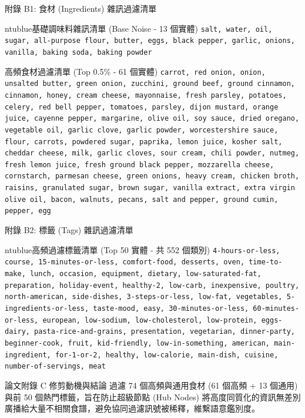 \documentclass[aspectratio=169, 10pt]{beamer}
\begin{document}
\begin{frame}{附錄 B1: 食材 (Ingredients) 雜訊過濾清單}
  \begin{mybox}{ntublue}{基礎調味料雜訊清單 (Base Noise - 13 個實體)}
    \small \texttt{salt, water, oil, sugar, all-purpose flour, butter, eggs, black pepper, garlic, onions, vanilla, baking soda, baking powder}
  \end{mybox}
  
  \vspace{0.1cm}
  \begin{examplebox}{高頻食材過濾清單 (Top 0.5\% - 61 個實體)}
    \tiny
    \texttt{carrot, red onion, onion, unsalted butter, green onion, zucchini, ground beef, ground cinnamon, cinnamon, honey, cream cheese, mayonnaise, fresh parsley, potatoes, celery, red bell pepper, tomatoes, parsley, dijon mustard, orange juice, cayenne pepper, margarine, olive oil, soy sauce, dried oregano, vegetable oil, garlic clove, garlic powder, worcestershire sauce, flour, carrots, powdered sugar, paprika, lemon juice, kosher salt, cheddar cheese, milk, garlic cloves, sour cream, chili powder, nutmeg, fresh lemon juice, fresh ground black pepper, mozzarella cheese, cornstarch, parmesan cheese, green onions, heavy cream, chicken broth, raisins, granulated sugar, brown sugar, vanilla extract, extra virgin olive oil, bacon, walnuts, pecans, salt and pepper, ground cumin, pepper, egg}
  \end{examplebox}
\end{frame}

\begin{frame}{附錄 B2: 標籤 (Tags) 雜訊過濾清單}
  \begin{mybox}{ntublue}{高頻過濾標籤清單 (Top 50 實體 - 共 552 個類別)}
    \tiny
    \texttt{4-hours-or-less, course, 15-minutes-or-less, comfort-food, desserts, oven, time-to-make, lunch, occasion, equipment, dietary, low-saturated-fat, preparation, holiday-event, healthy-2, low-carb, inexpensive, poultry, north-american, side-dishes, 3-steps-or-less, low-fat, vegetables, 5-ingredients-or-less, taste-mood, easy, 30-minutes-or-less, 60-minutes-or-less, european, low-sodium, low-cholesterol, low-protein, eggs-dairy, pasta-rice-and-grains, presentation, vegetarian, dinner-party, beginner-cook, fruit, kid-friendly, low-in-something, american, main-ingredient, for-1-or-2, healthy, low-calorie, main-dish, cuisine, number-of-servings, meat}
  \end{mybox}

  \vspace{0.15cm}
  \begin{alertblock}{論文附錄 C 修剪動機與結論}
    過濾 74 個高頻與通用食材 (61 個高頻 + 13 個通用) 與前 50 個熱門標籤，旨在防止超級節點 (Hub Nodes) 將高度同質化的資訊無差別廣播給大量不相關食譜，避免協同過濾訊號被稀釋，維繫語意鑑別度。
  \end{alertblock}
\end{frame}
\end{document}
